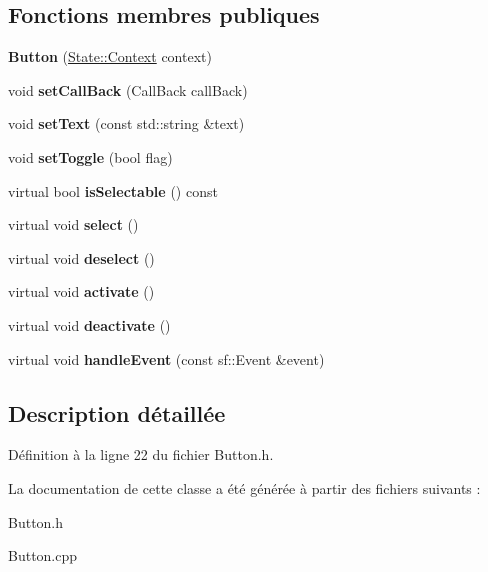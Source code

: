 \subsection*{Fonctions membres publiques}
\begin{DoxyCompactItemize}
\item 
\hypertarget{class_g_u_i_1_1_button_a8e44cbb42ddc953245922e6b6981ab58}{}\label{class_g_u_i_1_1_button_a8e44cbb42ddc953245922e6b6981ab58} 
{\bfseries Button} (\hyperlink{struct_state_1_1_context}{State\+::\+Context} context)
\item 
\hypertarget{class_g_u_i_1_1_button_a31d184f24a264215a7d4eb53a216d6ea}{}\label{class_g_u_i_1_1_button_a31d184f24a264215a7d4eb53a216d6ea} 
void {\bfseries set\+Call\+Back} (Call\+Back call\+Back)
\item 
\hypertarget{class_g_u_i_1_1_button_a89e964d353192135d6a77aeff33bbc41}{}\label{class_g_u_i_1_1_button_a89e964d353192135d6a77aeff33bbc41} 
void {\bfseries set\+Text} (const std\+::string \&text)
\item 
\hypertarget{class_g_u_i_1_1_button_a8198052cf4fe5823c9f5513e778ca94d}{}\label{class_g_u_i_1_1_button_a8198052cf4fe5823c9f5513e778ca94d} 
void {\bfseries set\+Toggle} (bool flag)
\item 
\hypertarget{class_g_u_i_1_1_button_a3a8cf4907161a7cc75a9353dd48c4f12}{}\label{class_g_u_i_1_1_button_a3a8cf4907161a7cc75a9353dd48c4f12} 
virtual bool {\bfseries is\+Selectable} () const
\item 
\hypertarget{class_g_u_i_1_1_button_a8f141129acb9c068ba6b8d19974d8291}{}\label{class_g_u_i_1_1_button_a8f141129acb9c068ba6b8d19974d8291} 
virtual void {\bfseries select} ()
\item 
\hypertarget{class_g_u_i_1_1_button_a6fd040a471dc3ae48ad59cacd93c7292}{}\label{class_g_u_i_1_1_button_a6fd040a471dc3ae48ad59cacd93c7292} 
virtual void {\bfseries deselect} ()
\item 
\hypertarget{class_g_u_i_1_1_button_ad711a129863e0301c52b896911996123}{}\label{class_g_u_i_1_1_button_ad711a129863e0301c52b896911996123} 
virtual void {\bfseries activate} ()
\item 
\hypertarget{class_g_u_i_1_1_button_ab0a1773817447712b17ab1ad6da767da}{}\label{class_g_u_i_1_1_button_ab0a1773817447712b17ab1ad6da767da} 
virtual void {\bfseries deactivate} ()
\item 
\hypertarget{class_g_u_i_1_1_button_a4d30e4caedd4c4373567ef452acd1fb1}{}\label{class_g_u_i_1_1_button_a4d30e4caedd4c4373567ef452acd1fb1} 
virtual void {\bfseries handle\+Event} (const sf\+::\+Event \&event)
\end{DoxyCompactItemize}


\subsection{Description détaillée}


Définition à la ligne 22 du fichier Button.\+h.



La documentation de cette classe a été générée à partir des fichiers suivants \+:\begin{DoxyCompactItemize}
\item 
Button.\+h\item 
Button.\+cpp\end{DoxyCompactItemize}
